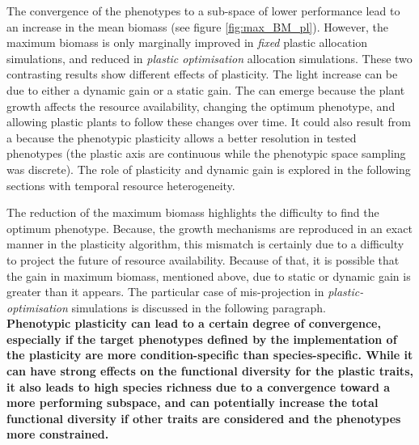 The convergence of the phenotypes to a sub-space of lower performance lead to an increase in the mean biomass (see figure \ref{fig:max_BM_pl}). However, the maximum biomass is only marginally improved in \textit{fixed} plastic allocation simulations, and reduced in \textit{plastic optimisation} allocation simulations. These two contrasting results show different effects of plasticity. The light increase can be due to either a dynamic gain or a static gain. The  can emerge because the plant growth affects the resource availability, changing the optimum phenotype, and allowing plastic plants to follow these changes over time. It could also result from a  because the phenotypic plasticity allows a better resolution in tested phenotypes (the plastic axis are continuous while the phenotypic space sampling was discrete). The role of plasticity and dynamic gain is explored in the following sections with temporal resource heterogeneity.

The reduction of the maximum biomass highlights the difficulty to find the optimum phenotype. Because, the growth mechanisms are reproduced in an exact manner in the plasticity algorithm, this mismatch is certainly due to a difficulty to project the future of resource availability. Because of that, it is possible that the gain in maximum biomass, mentioned above, due to static or dynamic gain is greater than it appears. The particular case of mis-projection in \textit{plastic-optimisation} simulations is discussed in the following paragraph. \\

\textbf{Phenotypic plasticity can lead to a certain degree of convergence, especially if the target phenotypes defined by the implementation of the plasticity are more condition-specific than species-specific. While it can have strong effects on the functional diversity for the plastic traits, it also leads to high species richness due to a convergence toward a more performing subspace, and can potentially increase the total functional diversity if other traits are considered and the phenotypes more constrained. }



